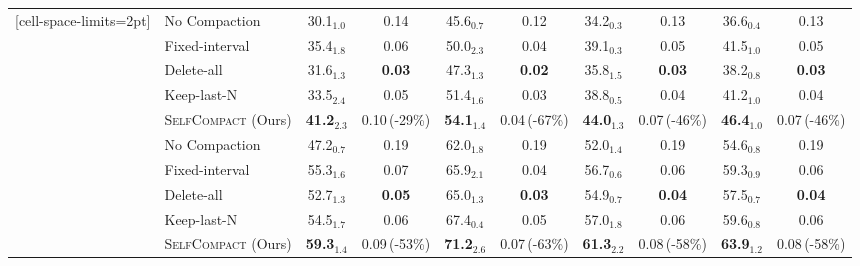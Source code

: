 \documentclass{article}
\newcommand{\method}{\textsc{{SelfCompact}}}
\begin{document}
\begin{table}[h!]
\begin{NiceTabular}{llcccccccc}[cell-space-limits=2pt]
\midrule \midrule
{}
& No Compaction               & 30.1$_{1.0}$ & 0.14 & 45.6$_{0.7}$          & 0.12          & 34.2$_{0.3}$ & 0.13 & 36.6$_{0.4}$ & 0.13 \\
& Fixed-interval & 35.4$_{1.8}$ & 0.06 & 50.0$_{2.3}$          & 0.04 & 39.1$_{0.3}$ & 0.05 & 41.5$_{1.0}$ & 0.05 \\
& Delete-all & 31.6$_{1.3}$ & \textbf{0.03} & 47.3$_{1.3}$ & \textbf{0.02} & 35.8$_{1.5}$ & \textbf{0.03} & 38.2$_{0.8}$ & \textbf{0.03} \\
& Keep-last-N & 33.5$_{2.4}$ & 0.05 & 51.4$_{1.6}$ & 0.03 & 38.8$_{0.5}$ & 0.04 & 41.2$_{1.0}$ & 0.04 \\
\cmidrule(lr){2-10}
& \method{} (Ours)    & \textbf{41.2}$_{2.3}$ & 0.10\,\textcolor{green!60!black}{\scriptsize(-29\%)} & \textbf{54.1}$_{1.4}$ & 0.04\,\textcolor{green!60!black}{\scriptsize(-67\%)} & \textbf{44.0}$_{1.3}$ & 0.07\,\textcolor{green!60!black}{\scriptsize(-46\%)} & \textbf{46.4}$_{1.0}$ & 0.07\,\textcolor{green!60!black}{\scriptsize(-46\%)} \\

\midrule
{}
& No Compaction              & 47.2$_{0.7}$ & 0.19 & 62.0$_{1.8}$          & 0.19 & 52.0$_{1.4}$ & 0.19 & 54.6$_{0.8}$ & 0.19 \\
& Fixed-interval & 55.3$_{1.6}$ & 0.07 & 65.9$_{2.1}$          & 0.04 & 56.7$_{0.6}$ & 0.06 & 59.3$_{0.9}$ & 0.06 \\
& Delete-all & 52.7$_{1.3}$ & \textbf{0.05} & 65.0$_{1.3}$ & \textbf{0.03} & 54.9$_{0.7}$ & \textbf{0.04} & 57.5$_{0.7}$ & \textbf{0.04} \\
& Keep-last-N &  54.5$_{1.7}$ & 0.06 & 67.4$_{0.4}$ & 0.05 & 57.0$_{1.8}$ & 0.06 & 59.6$_{0.8}$ & 0.06 \\
\cmidrule(lr){2-10}
& \method{}  (Ours)   & \textbf{59.3}$_{1.4}$ & 0.09\,\textcolor{green!60!black}{\scriptsize(-53\%)} & \textbf{71.2}$_{2.6}$ & 0.07\,\textcolor{green!60!black}{\scriptsize(-63\%)} & \textbf{61.3}$_{2.2}$ & 0.08\,\textcolor{green!60!black}{\scriptsize(-58\%)} & \textbf{63.9}$_{1.2}$ & 0.08\,\textcolor{green!60!black}{\scriptsize(-58\%)} \\


\end{NiceTabular}
\end{table}
\end{document}
